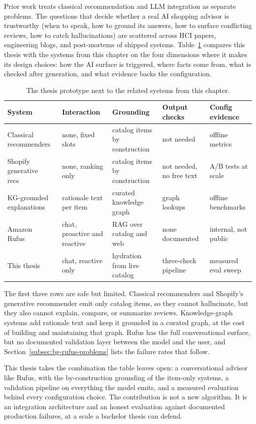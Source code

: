 Prior work treats classical recommendation and LLM integration
as separate problems. The questions that decide whether a real
AI shopping advisor is trustworthy (when to speak, how to ground
its answers, how to surface conflicting reviews, how to catch
hallucinations) are scattered across HCI papers, engineering
blogs, and post-mortems of shipped systems.
Table~\ref{tab:bg-positioning} compares this thesis with the
systems from this chapter on the four dimensions where it makes
its design choices: how the AI surface is triggered, where facts
come from, what is checked after generation, and what evidence
backs the configuration.

\begin{table}[ht]
  \centering
  \footnotesize
  \begin{tabular}{p{2.6cm} p{2.2cm} p{2.4cm} p{2.1cm} p{2.1cm}}
    \toprule
    System & Interaction & Grounding & Output checks &
    Config evidence \\
    \midrule
    Classical recommenders \cite{ComprehensiveRecSys2024} &
    none, fixed slots &
    catalog items by construction &
    not needed &
    offline metrics \\
    Shopify generative recs~\cite{ShopifyHSTU} &
    none, ranking only &
    catalog items by construction &
    not needed, no free text &
    A/B tests at scale \\
    KG-grounded explanations~\cite{ExplainableRecKG2024} &
    rationale text per item &
    curated knowledge graph &
    graph lookups &
    offline benchmarks \\
    Amazon Rufus~\cite{RufusTechnology} &
    chat, proactive and reactive &
    RAG over catalog and web &
    none documented &
    internal, not public \\
    This thesis &
    chat, reactive only &
    hydration from live catalog &
    three-check pipeline &
    measured eval sweep \\
    \bottomrule
  \end{tabular}
  \caption{The thesis prototype next to the related systems from
  this chapter.}
  \label{tab:bg-positioning}
\end{table}

The first three rows are safe but limited. Classical
recommenders and Shopify's generative recommender emit only
catalog items, so they cannot hallucinate, but they also cannot
explain, compare, or summarize reviews. Knowledge-graph systems
add rationale text and keep it grounded in a curated graph, at
the cost of building and maintaining that graph. Rufus has the
full conversational surface, but no documented validation layer
between the model and the user, and
Section~\ref{subsec:bg-rufus-problems} lists the failure rates
that follow.

This thesis takes the combination the table leaves open: a
conversational advisor like Rufus, with the by-construction
grounding of the item-only systems, a validation pipeline on
everything the model emits, and a measured evaluation behind
every configuration choice. The contribution is not a new
algorithm. It is an integration architecture and an honest
evaluation against documented production failures, at a scale a
bachelor thesis can defend.
